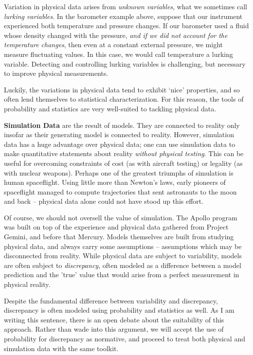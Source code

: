 \documentclass[../primer.tex]{subfiles}
\begin{document}
Variation in physical data arises from \emph{unknown variables}, what we
sometimes call \emph{lurking variables}.\cite{box1966} In the barometer example
above, suppose that our instrument experienced both temperature and pressure
changes. If our barometer used a fluid whose density changed with the pressure,
\emph{and if we did not account for the temperature changes}, then even at a
constant external pressure, we might measure fluctuating values. In this case,
we would call temperature a lurking variable. Detecting and controlling lurking
variables is challenging, but necessary to improve physical
measurements.\cite{joiner1981,delRosario2017lurking}

Luckily, the variations in physical data tend to exhibit `nice' properties, and
so often lend themselves to statistical characterization. For this reason, the
tools of probability and statistics are very well-suited to tackling physical
data.

\textbf{Simulation Data} are the result of models. They are connected to reality
only insofar as their generating model is connected to reality. However,
simulation data has a huge advantage over physical data; one can use simulation
data to make quantitative statements about reality \emph{without physical
  testing}. This can be useful for overcoming constraints of cost (as with
aircraft testing) or legality (as with nuclear weapons). Perhaps one of the
greatest triumphs of simulation is human spaceflight. Using little more than
Newton's laws, early pioneers of spaceflight managed to compute trajectories
that sent astronauts to the moon and back -- physical data alone could not have
stood up this effort.

Of course, we should not oversell the value of simulation. The Apollo program
was built on top of the experience and physical data gathered from Project
Gemini, and before that Mercury. Models themselves are built from studying
physical data, and always carry some assumptions -- assumptions which may be
disconnected from reality. While physical data are subject to variability,
models are often subject to \emph{discrepancy}, often modeled as a difference
between a model prediction and the 'true' value that would arise from a perfect
measurement in physical reality.\cite{higdon2004calibration-prediction}

Despite the fundamental difference between variability and discrepancy,
discrepancy is often modeled using probability and statistics as
well.\cite{kennedy2001bayesian,higdon2004calibration-prediction} As I am writing
this sentence, there is an open debate about the suitability of this approach.
Rather than wade into this argument, we will accept the use of probability for
discrepancy as normative, and proceed to treat both physical and simulation data
with the same toolkit.
\end{document}
